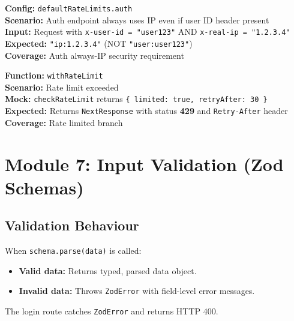 \documentclass[12pt,a4paper]{report}
\newcommand{\pone}{\textbf{\color{p1red}P1}}
\begin{document}
\begin{tcolorbox}[criticalbox, title={RATE-005 \hfill \pone\ --- Auth Always Uses IP}]
\textbf{Config:} \texttt{defaultRateLimits.auth} \\
\textbf{Scenario:} Auth endpoint always uses IP even if user ID header present \\
\textbf{Input:} Request with \texttt{x-user-id = "user123"} AND \texttt{x-real-ip = "1.2.3.4"} \\
\textbf{Expected:} \texttt{"ip:1.2.3.4"} (NOT \texttt{"user:user123"}) \\
\textbf{Coverage:} Auth always-IP security requirement
\end{tcolorbox}

\begin{tcolorbox}[testbox, title={RATE-007 \hfill \pone}]
\textbf{Function:} \texttt{withRateLimit} \\
\textbf{Scenario:} Rate limit exceeded \\
\textbf{Mock:} \texttt{checkRateLimit} returns \texttt{\{ limited: true, retryAfter: 30 \}} \\
\textbf{Expected:} Returns \texttt{NextResponse} with status \textbf{429} and \texttt{Retry-After} header \\
\textbf{Coverage:} Rate limited branch
\end{tcolorbox}


\chapter{Module 7: Input Validation (Zod Schemas)}

\section{Validation Behaviour}

\begin{tcolorbox}[infobox, title={Zod Schema Behaviour}]
When \texttt{schema.parse(data)} is called:
\begin{itemize}
  \item \textbf{Valid data:} Returns typed, parsed data object.
  \item \textbf{Invalid data:} Throws \texttt{ZodError} with field-level error messages.
\end{itemize}
The login route catches \texttt{ZodError} and returns HTTP 400.
\end{tcolorbox}
\end{document}
